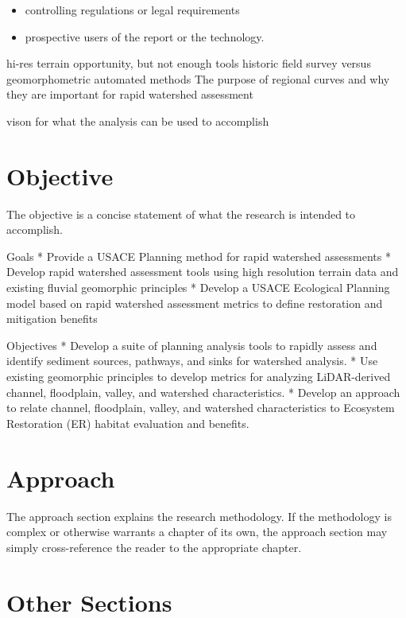 \documentclass[]{book}
\providecommand{\tightlist}{%
  \setlength{\itemsep}{0pt}\setlength{\parskip}{0pt}}
\theoremstyle{definition}
\theoremstyle{definition}
\theoremstyle{definition}
\theoremstyle{remark}
\begin{document}
\begin{itemize}
\tightlist
\item
  controlling regulations or legal requirements
\item
  prospective users of the report or the technology.
\end{itemize}

hi-res terrain opportunity, but not enough tools historic field survey
versus geomorphometric automated methods The purpose of regional curves
and why they are important for rapid watershed assessment

vison for what the analysis can be used to accomplish

\section{Objective}\label{objective}

The objective is a concise statement of what the research is intended to
accomplish.

Goals * Provide a USACE Planning method for rapid watershed assessments
* Develop rapid watershed assessment tools using high resolution terrain
data and existing fluvial geomorphic principles * Develop a USACE
Ecological Planning model based on rapid watershed assessment metrics to
define restoration and mitigation benefits

Objectives * Develop a suite of planning analysis tools to rapidly
assess and identify sediment sources, pathways, and sinks for watershed
analysis. * Use existing geomorphic principles to develop metrics for
analyzing LiDAR-derived channel, floodplain, valley, and watershed
characteristics. * Develop an approach to relate channel, floodplain,
valley, and watershed characteristics to Ecosystem Restoration (ER)
habitat evaluation and benefits.

\section{Approach}\label{approach}

The approach section explains the research methodology. If the
methodology is complex or otherwise warrants a chapter of its own, the
approach section may simply cross-reference the reader to the
appropriate chapter.

\section{Other Sections}\label{other-sections}
\end{document}
